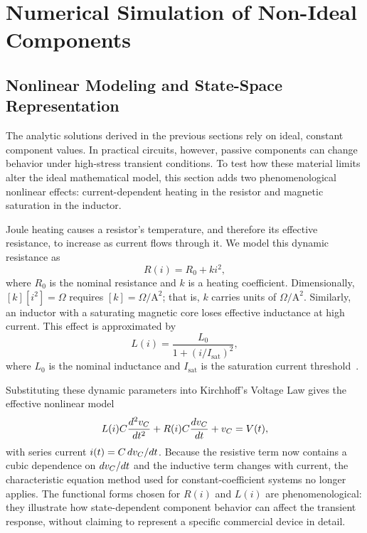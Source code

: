\section{Numerical Simulation of Non-Ideal Components}
\label{sec:nonideal}

\subsection{Nonlinear Modeling and State-Space Representation}

The analytic solutions derived in the previous sections rely on ideal,
constant component values.
In practical circuits, however, passive components can change behavior under
high-stress transient conditions.
To test how these material limits alter the ideal mathematical model, this
section adds two phenomenological nonlinear effects: current-dependent
heating in the resistor and magnetic saturation in the inductor.

Joule heating causes a resistor's temperature, and therefore its effective
resistance, to increase as current flows through it.
We model this dynamic resistance as
\begin{equation}
  R(i) = R_0 + k i^2,
  \label{eq:thermal_resistance}
\end{equation}
where $R_0$ is the nominal resistance and $k$ is a heating coefficient.
Dimensionally, $[k][i^2] = \Omega$ requires $[k] = \Omega/\mathrm{A}^2$;
that is, $k$ carries units of $\Omega/\mathrm{A}^2$.
Similarly, an inductor with a saturating magnetic core loses effective
inductance at high current.
This effect is approximated by
\begin{equation}
  L(i) = \frac{L_0}{1 + (i/I_{\mathrm{sat}})^2},
  \label{eq:saturating_inductance}
\end{equation}
where $L_0$ is the nominal inductance and $I_{\mathrm{sat}}$ is the saturation
current threshold~\cite{mohan2002}.

Substituting these dynamic parameters into Kirchhoff's Voltage Law gives the
effective nonlinear model
\begin{equation}
  L(i)C\frac{d^2v_C}{dt^2} + R(i)C\frac{dv_C}{dt} + v_C = V(t),
  \label{eq:nonlinear_rlc}
\end{equation}
with series current $i(t)=C\,dv_C/dt$.
Because the resistive term now contains a cubic dependence on
$dv_C/dt$ and the inductive term changes with current, the characteristic
equation method used for constant-coefficient systems no longer applies.
The functional forms chosen for $R(i)$ and $L(i)$ are phenomenological:
they illustrate how state-dependent component behavior can affect the
transient response, without claiming to represent a specific commercial
device in detail.

